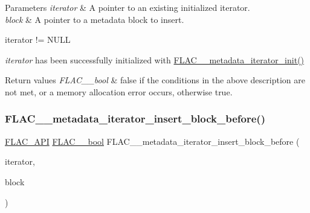 \begin{DoxyParams}{Parameters}
{\em iterator} & A pointer to an existing initialized iterator. \\
\hline
{\em block} & A pointer to a metadata block to insert.  
\begin{DoxyCode}
iterator != NULL 
\end{DoxyCode}
 {\itshape iterator} has been successfully initialized with \hyperlink{group__flac__metadata__level2_ga4a5af69a1f19436b02f738eb8c97c959}{F\+L\+A\+C\+\_\+\+\_\+metadata\+\_\+iterator\+\_\+init()} \\
\hline
\end{DoxyParams}

\begin{DoxyRetVals}{Return values}
{\em F\+L\+A\+C\+\_\+\+\_\+bool} & {\ttfamily false} if the conditions in the above description are not met, or a memory allocation error occurs, otherwise {\ttfamily true}. \\
\hline
\end{DoxyRetVals}
\mbox{\label{group__flac__metadata__level2_ga163c1b4d8fdd72c0d6fb8816b2ae9b18}} 
\subsubsection{\texorpdfstring{F\+L\+A\+C\+\_\+\+\_\+metadata\+\_\+iterator\+\_\+insert\+\_\+block\+\_\+before()}{FLAC\_\_metadata\_iterator\_insert\_block\_before()}}
{\footnotesize\ttfamily \hyperlink{group__flac__export_ga56ca07df8a23310707732b1c0007d6f5}{F\+L\+A\+C\+\_\+\+A\+PI} \hyperlink{ordinals_8h_a95103469f1cbd78b8cf250194985b34e}{F\+L\+A\+C\+\_\+\+\_\+bool} F\+L\+A\+C\+\_\+\+\_\+metadata\+\_\+iterator\+\_\+insert\+\_\+block\+\_\+before (\begin{DoxyParamCaption}\item[{\hyperlink{group__flac__metadata__level2_ga9f3e135a07cdef7e51597646aa7b89b2}{F\+L\+A\+C\+\_\+\+\_\+\+Metadata\+\_\+\+Iterator} $\ast$}]{iterator,  }\item[{\hyperlink{struct_f_l_a_c_____stream_metadata}{F\+L\+A\+C\+\_\+\+\_\+\+Stream\+Metadata} $\ast$}]{block }\end{DoxyParamCaption})}

